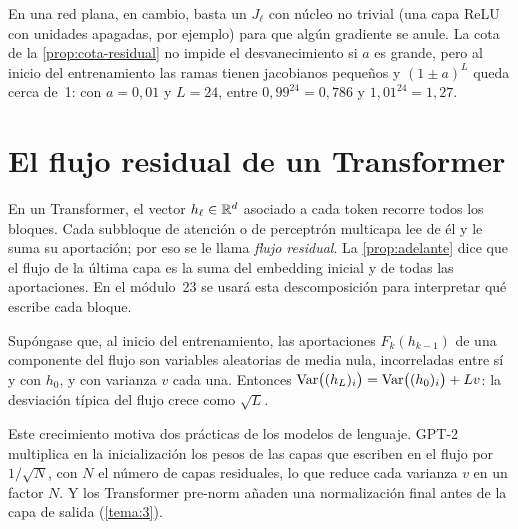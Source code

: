 En una red plana, en cambio, basta un $J_\ell$ con núcleo no trivial (una capa ReLU con unidades apagadas, por ejemplo) para que algún gradiente se anule. La cota de la \cref{prop:cota-residual} no impide el desvanecimiento si $a$ es grande, pero al inicio del entrenamiento las ramas tienen jacobianos pequeños y $(1\pm a)^{L}$ queda cerca de~1: con $a=0{,}01$ y $L=24$, entre $0{,}99^{24}=0{,}786$ y $1{,}01^{24}=1{,}27$.

\addtocounter{figure}{1}%

\section{El flujo residual de un Transformer}

En un Transformer, el vector $h_\ell\in\mathbb{R}^{d}$ asociado a cada token recorre todos los bloques. Cada subbloque de atención o de perceptrón multicapa lee de él y le suma su aportación; por eso se le llama \emph{flujo residual}. La \cref{prop:adelante} dice que el flujo de la última capa es la suma del embedding inicial y de todas las aportaciones. En el módulo~23 se usará esta descomposición para interpretar qué escribe cada bloque.

\begin{proposicion}\label{prop:crecimiento}
Supóngase que, al inicio del entrenamiento, las aportaciones $F_k(h_{k-1})$ de una componente del flujo son variables aleatorias de media nula, incorreladas entre sí y con $h_0$, y con varianza $v$ cada una. Entonces $\operatorname{Var}\bigl((h_L)_i\bigr)=\operatorname{Var}\bigl((h_0)_i\bigr)+Lv$: la desviación típica del flujo crece como $\sqrt{L}$.
\end{proposicion}

Este crecimiento motiva dos prácticas de los modelos de lenguaje. GPT-2~\cite[§2.3]{gpt2} multiplica en la inicialización los pesos de las capas que escriben en el flujo por $1/\sqrt{N}$, con $N$ el número de capas residuales, lo que reduce cada varianza $v$ en un factor $N$. Y los Transformer pre-norm añaden una normalización final antes de la capa de salida (\cref{tema:3}).

\addtocounter{definicion}{1}%


